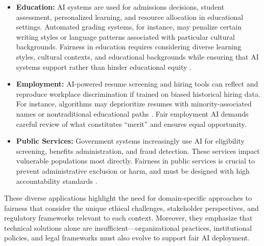 \documentclass[12pt,a4paper,openright,twoside]{book}
\begin{document}
\begin{itemize}
    \item \textbf{Education:} AI systems are used for admissions decisions, student assessment, personalized learning, and resource allocation in educational settings. Automated grading systems, for instance, may penalize certain writing styles or language patterns associated with particular cultural backgrounds. Fairness in education requires considering diverse learning styles, cultural contexts, and educational backgrounds while ensuring that AI systems support rather than hinder educational equity \cite{mehrabi2021survey}.
    
    \item \textbf{Employment:} AI-powered resume screening and hiring tools can reflect and reproduce workplace discrimination if trained on biased historical hiring data. For instance, algorithms may deprioritize resumes with minority-associated names or nontraditional educational paths \cite{Chen2023}. Fair employment AI demands careful review of what constitutes “merit” and ensures equal opportunity.
    
    \item \textbf{Public Services:} Government systems increasingly use AI for eligibility screening, benefits administration, and fraud detection. These services impact vulnerable populations most directly. Fairness in public services is crucial to prevent administrative exclusion or harm, and must be designed with high accountability standards \cite{suresh2021framework}.
\end{itemize}

These diverse applications highlight the need for domain-specific approaches to fairness that consider the unique ethical challenges, stakeholder perspectives, and regulatory frameworks relevant to each context. Moreover, they emphasize that technical solutions alone are insufficient—organizational practices, institutional policies, and legal frameworks must also evolve to support fair AI deployment.
\end{document}
